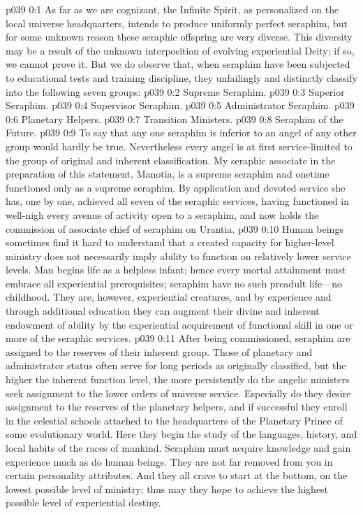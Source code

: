 \author{Melchizedek}
\vs p039 0:1 As far as we are cognizant, the Infinite Spirit, as personalized on the local universe headquarters, intends to produce uniformly perfect seraphim, but for some unknown reason these seraphic offspring are very diverse. This diversity may be a result of the unknown interposition of evolving experiential Deity; if so, we cannot prove it. But we do observe that, when seraphim have been subjected to educational tests and training discipline, they unfailingly and distinctly classify into the following seven groups:
\pc \vs p039 0:2 \bibnobreakspace Supreme Seraphim.
\vs p039 0:3 \bibnobreakspace Superior Seraphim.
\vs p039 0:4 \bibnobreakspace Supervisor Seraphim.
\vs p039 0:5 \bibnobreakspace Administrator Seraphim.
\vs p039 0:6 \bibnobreakspace Planetary Helpers.
\vs p039 0:7 \bibnobreakspace Transition Ministers.
\vs p039 0:8 \bibnobreakspace Seraphim of the Future.
\pc \vs p039 0:9 To say that any one seraphim is inferior to an angel of any other group would hardly be true. Nevertheless every angel is at first service\hyp{}limited to the group of original and inherent classification. My seraphic associate in the preparation of this statement, Manotia, is a supreme seraphim and onetime functioned only as a supreme seraphim. By application and devoted service she has, one by one, achieved all seven of the seraphic services, having functioned in well\hyp{}nigh every avenue of activity open to a seraphim, and now holds the commission of associate chief of seraphim on Urantia.
\vs p039 0:10 Human beings sometimes find it hard to understand that a created capacity for higher\hyp{}level ministry does not necessarily imply ability to function on relatively lower service levels. Man begins life as a helpless infant; hence every mortal attainment must embrace all experiential prerequisites; seraphim have no such preadult life---no childhood. They are, however, experiential creatures, and by experience and through additional education they can augment their divine and inherent endowment of ability by the experiential acquirement of functional skill in one or more of the seraphic services.\plusone
\vs p039 0:11 After being commissioned, seraphim are assigned to the reserves of their inherent group. Those of planetary and administrator status often serve for long periods as originally classified, but the higher the inherent function level, the more persistently do the angelic ministers seek assignment to the lower orders of universe service. Especially do they desire assignment to the reserves of the planetary helpers, and if successful they enroll in the celestial schools attached to the headquarters of the Planetary Prince of some evolutionary world. Here they begin the study of the languages, history, and local habits of the races of mankind. Seraphim must acquire knowledge and gain experience much as do human beings. They are not far removed from you in certain personality attributes. And they all crave to start at the bottom, on the lowest possible level of ministry; thus may they hope to achieve the highest possible level of experiential destiny.
